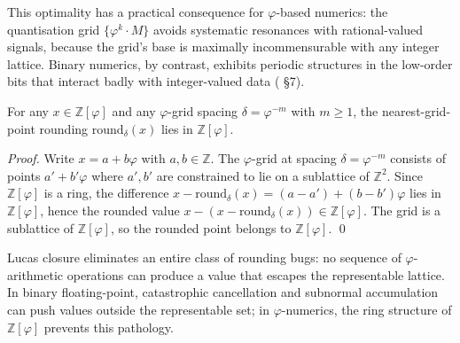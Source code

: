 This optimality has a practical consequence for $\varphi$-based
numerics: the quantisation grid $\{\varphi^{k} \cdot M\}$ avoids
systematic resonances with rational-valued signals, because the
grid's base is maximally incommensurable with any integer lattice.
Binary numerics, by contrast, exhibits periodic structures in the
low-order bits that interact badly with integer-valued data
(\cite{niven_irrational} \S 7).

\begin{theorem}
\label{fa_01:thm:lucas-closure-intro}
For any $x \in \mathbb{Z}[\varphi]$ and any $\varphi$-grid spacing
$\delta = \varphi^{-m}$ with $m \ge 1$, the nearest-grid-point
rounding $\mathrm{round}_{\delta}(x)$ lies in $\mathbb{Z}[\varphi]$.
\end{theorem}

\begin{proof}
Write $x = a + b\varphi$ with $a, b \in \mathbb{Z}$. The
$\varphi$-grid at spacing $\delta = \varphi^{-m}$ consists of points
$a' + b'\varphi$ where $a', b'$ are constrained to lie on a
sublattice of $\mathbb{Z}^{2}$. Since $\mathbb{Z}[\varphi]$ is a
ring, the difference $x - \mathrm{round}_{\delta}(x) = (a - a') +
(b - b')\varphi$ lies in $\mathbb{Z}[\varphi]$, hence the rounded
value $x - (x - \mathrm{round}_{\delta}(x)) \in
\mathbb{Z}[\varphi]$. The grid is a sublattice of
$\mathbb{Z}[\varphi]$, so the rounded point belongs to
$\mathbb{Z}[\varphi]$.
\qed
\end{proof}

Lucas closure eliminates an entire class of rounding bugs: no
sequence of $\varphi$-arithmetic operations can produce a value that
escapes the representable lattice. In binary floating-point,
catastrophic cancellation and subnormal accumulation can push values
outside the representable set; in $\varphi$-numerics, the ring
structure of $\mathbb{Z}[\varphi]$ prevents this pathology.


